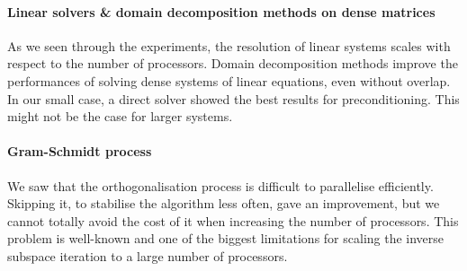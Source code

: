 \paragraph{Linear solvers \& domain decomposition methods on dense matrices}
As we seen through the experiments, the resolution of linear systems scales with respect to the number of processors.
Domain decomposition methods improve the performances of solving dense systems of linear equations, even without overlap.
In our small case, a direct solver showed the best results for preconditioning.
This might not be the case for larger systems.

\paragraph{Gram-Schmidt process}
We saw that the orthogonalisation process is difficult to parallelise efficiently.
Skipping it, to stabilise the algorithm less often, gave an improvement, but we cannot totally avoid the cost of it when increasing the number of processors.
This problem is well-known and one of the biggest limitations for scaling the inverse subspace iteration to a large number of processors.
